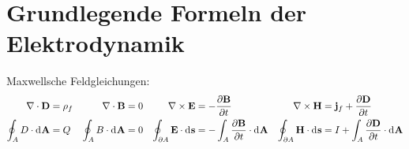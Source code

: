 \section{Grundlegende Formeln der Elektrodynamik}

Maxwellsche Feldgleichungen:
\begin{align*}
	\nabla \cdot \mathbf{D}                        & =\rho _{f}                                                       &
	\nabla \cdot \mathbf{B}                        & =0                                                               &
	\nabla \times \mathbf{E}                       & =-\frac{\partial \mathbf{B}}{\partial t}                           &
	\nabla \times \mathbf{H}                       & =\mathbf{j}_{f}+\frac{\partial \mathbf{D}}{\partial t}                 \\
	\oint_A D \cdot\mathop{\mathrm{d}^{}\mathbf{A}}               & =Q                                                               &
	\oint_A B \cdot\mathop{\mathrm{d}^{}\mathbf{A}}               & =0                                                               &
	\oint_{\partial A}\mathbf{E}\cdot \mathop{\mathrm{d}^{}\mathbf{s}} & =    -\int_A\frac{\partial\mathbf{B}}{\partial t}\cdot\mathop{\mathrm{d}^{}\mathbf{A}} &
	\oint_{\partial A}\mathbf{H}\cdot \mathop{\mathrm{d}^{}\mathbf{s}} & = I + \int_A\frac{\partial\mathbf{D}}{\partial t}\cdot\mathop{\mathrm{d}^{}\mathbf{A}}
\end{align*}

